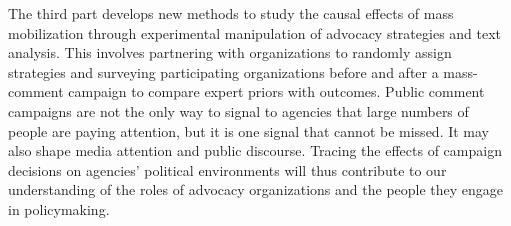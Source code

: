 \documentclass{article}
\begin{document}
{The third part develops new methods to study the causal effects of mass mobilization through experimental manipulation of advocacy strategies and text analysis. This involves partnering with organizations to randomly assign strategies and surveying participating organizations before and after a mass-comment campaign to compare expert priors with outcomes. Public comment campaigns are not the only way to signal to agencies that large numbers of people are paying attention, but it is one signal that cannot be missed. It may also shape media attention and public discourse. Tracing the effects of campaign decisions on agencies' political environments will thus contribute to our understanding of the roles of advocacy organizations and the people they engage in policymaking.} %
\pagebreak
\end{document}
